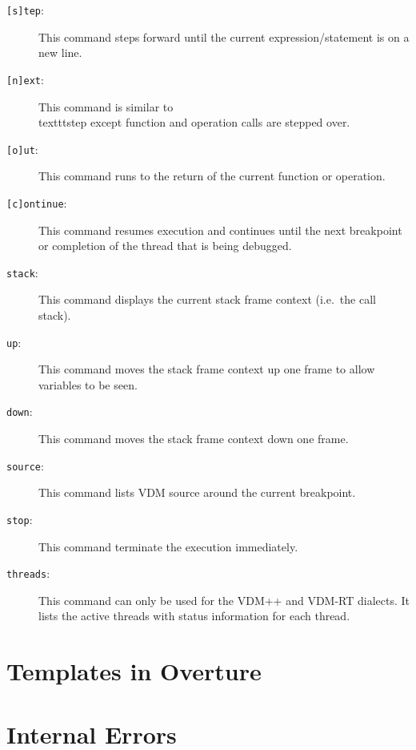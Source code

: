 \documentclass{overturerepsec}
\begin{document}
\begin{description}
\item[\texttt{[s]tep}:] This command steps forward until the
  current expression/statement is on a new line. 
\item[\texttt{[n]ext}:] This command is similar to \\texttt{step} except
 function and operation calls are stepped over.  
\item[\texttt{[o]ut}:] This command runs to the return of the current
  function or operation.  
\item[\texttt{[c]ontinue}:] This command resumes execution and continues
  until the next breakpoint or completion of the thread that is being
  debugged. 
\item[\texttt{stack}:] This command displays the current stack frame
  context (i.e.\ the call stack). 
\item[\texttt{up}:] This command moves the stack frame context up one
  frame to allow variables to be seen.  
\item[\texttt{down}:] This command moves the stack frame context down
  one frame.  
\item[\texttt{source}:] This command lists VDM source around the
  current breakpoint.  
\item[\texttt{stop}:] This command terminate the execution
  immediately.  
\item[\texttt{threads}:] This command can only be used for the VDM++
  and VDM-RT dialects. It lists the active threads with status
  information for each thread. 
\end{description}

\appendix
\newpage





\newpage
\section{Templates in Overture}\label{app:templates}

\newpage
\section{Internal Errors}\label{app:internalerrors}
\end{document}
